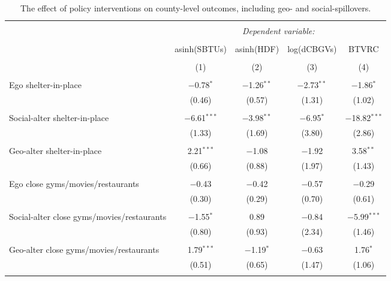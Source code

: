 
\begin{table}[!htbp] \centering 
  \caption{The effect of policy interventions on county-level outcomes, including geo- and social-spillovers.} 
  \label{tab:diff_in_diff_with_sp} 
\footnotesize 
\begin{tabular}{@{\extracolsep{5pt}}lcccc} 
\\[-1.8ex]\hline 
\hline \\[-1.8ex] 
 & \multicolumn{4}{c}{\textit{Dependent variable:}} \\ 
\cline{2-5} 
\\[-1.8ex] & asinh(SBTUs) & asinh(HDF) & log(dCBGVs) & BTVRC \\ 
\\[-1.8ex] & (1) & (2) & (3) & (4)\\ 
\hline \\[-1.8ex] 
 Ego shelter-in-place & $-$0.78$^{*}$ & $-$1.26$^{**}$ & $-$2.73$^{**}$ & $-$1.86$^{*}$ \\ 
  & (0.46) & (0.57) & (1.31) & (1.02) \\ 
  & & & & \\ 
 Social-alter shelter-in-place & $-$6.61$^{***}$ & $-$3.98$^{**}$ & $-$6.95$^{*}$ & $-$18.82$^{***}$ \\ 
  & (1.33) & (1.69) & (3.80) & (2.86) \\ 
  & & & & \\ 
 Geo-alter shelter-in-place & 2.21$^{***}$ & $-$1.08 & $-$1.92 & 3.58$^{**}$ \\ 
  & (0.66) & (0.88) & (1.97) & (1.43) \\ 
  & & & & \\ 
 Ego close gyms/movies/restaurants & $-$0.43 & $-$0.42 & $-$0.57 & $-$0.29 \\ 
  & (0.30) & (0.29) & (0.70) & (0.61) \\ 
  & & & & \\ 
 Social-alter close gyms/movies/restaurants & $-$1.55$^{*}$ & 0.89 & $-$0.84 & $-$5.99$^{***}$ \\ 
  & (0.80) & (0.93) & (2.34) & (1.46) \\ 
  & & & & \\ 
 Geo-alter close gyms/movies/restaurants & 1.79$^{***}$ & $-$1.19$^{*}$ & $-$0.63 & 1.76$^{*}$ \\ 
  & (0.51) & (0.65) & (1.47) & (1.06) \\ 
  & & & & \\ 

\end{tabular}
\end{table}
